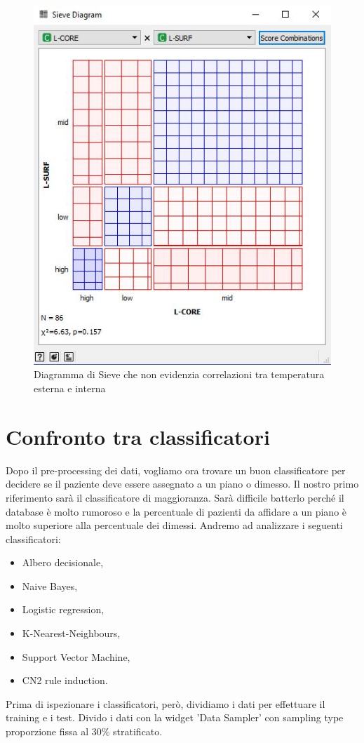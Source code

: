 \documentclass[a4paper, 12p]{report}
\begin{document}
\begin{figure}	
	\centering
	\includegraphics[scale = 0.6]{img/Sieve.JPG}
	\caption{Diagramma di Sieve che non evidenzia correlazioni tra temperatura esterna e interna }\label{fig:5}
\end{figure}
\chapter{Confronto tra classificatori}
Dopo il pre-processing dei dati, vogliamo ora trovare un buon classificatore per decidere se il paziente deve essere assegnato a un piano o dimesso. Il nostro primo riferimento sarà il classificatore di maggioranza. Sarà difficile batterlo perché il database è molto rumoroso e la percentuale di pazienti da affidare a un piano è molto superiore alla percentuale dei dimessi.
Andremo ad analizzare i seguenti classificatori:
\begin{itemize}
	\item Albero decisionale,
	\item Naive Bayes,
	\item Logistic regression,
	\item K-Nearest-Neighbours,
	\item Support Vector Machine,
	\item CN2 rule induction.
\end{itemize}		
	Prima di ispezionare i classificatori, però, dividiamo i dati per effettuare il training e i test. Divido i dati con la widget 'Data Sampler' con sampling type proporzione fissa al 30\% stratificato. 
	
\end{document}

